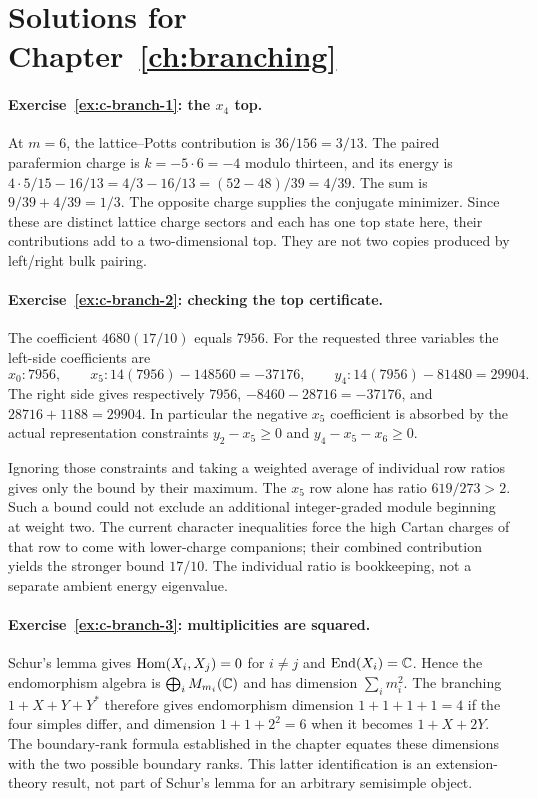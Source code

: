 \section{Solutions for Chapter~\ref{ch:branching}}

\paragraph{Exercise~\ref{ex:c-branch-1}: the $x_4$ top.}
\label{sol:ex:c-branch-1}
At $m=6$, the lattice--Potts contribution is $36/156=3/13$.
The paired parafermion charge is $k=-5\cdot6=-4$ modulo thirteen,
and its energy is
$4\cdot5/15-16/13=4/3-16/13=(52-48)/39=4/39$. The sum is
$9/39+4/39=1/3$. The opposite charge supplies the conjugate
minimizer. Since these are distinct lattice charge sectors and each
has one top state here, their contributions add to a two-dimensional
top. They are not two copies produced by left/right bulk pairing.



\paragraph{Exercise~\ref{ex:c-branch-2}: checking the top certificate.}
\label{sol:ex:c-branch-2}
The coefficient $4680(17/10)$ equals $7956$. For the requested
three variables the left-side coefficients are
\[
 x_0:7956,\qquad
 x_5:14(7956)-148560=-37176,\qquad
 y_4:14(7956)-81480=29904.
\]
The right side gives respectively $7956$,
$-8460-28716=-37176$, and $28716+1188=29904$.
In particular the negative $x_5$ coefficient is absorbed by
the actual representation constraints
$y_2-x_5\geq0$ and $y_4-x_5-x_6\geq0$.

Ignoring those constraints and taking a weighted average of
individual row ratios gives only the bound by their maximum.
The $x_5$ row alone has ratio $619/273>2$. Such a bound could
not exclude an additional integer-graded module beginning at
weight two. The current character inequalities force the high
Cartan charges of that row to come with lower-charge companions;
their combined contribution yields the stronger bound $17/10$.
The individual ratio is bookkeeping, not a separate ambient
energy eigenvalue.



\paragraph{Exercise~\ref{ex:c-branch-3}: multiplicities are squared.}
\label{sol:ex:c-branch-3}
Schur's lemma gives $\operatorname{Hom}(X_i,X_j)=0$ for $i\ne j$ and
$\operatorname{End}(X_i)=\mathbb C$. Hence the endomorphism algebra is
$\bigoplus_iM_{m_i}(\mathbb C)$ and has dimension $\sum_i m_i^2$.
The branching $1+X+Y+Y^*$ therefore gives endomorphism dimension
$1+1+1+1=4$ if the four simples differ, and dimension
$1+1+2^2=6$ when it becomes $1+X+2Y$.
The boundary-rank formula established in the chapter equates these
dimensions with the two possible boundary ranks. This latter
identification is an extension-theory result, not part of Schur's
lemma for an arbitrary semisimple object.



